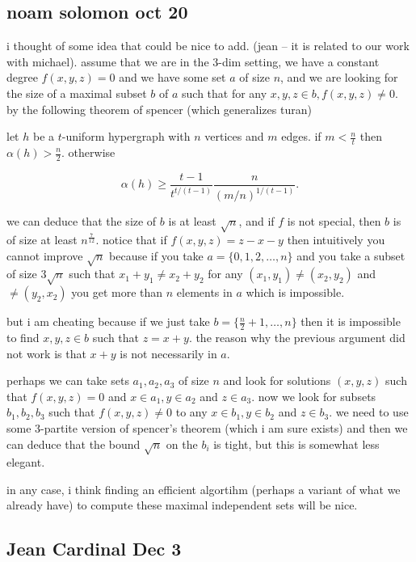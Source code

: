 \subsection{noam solomon oct 20}
i thought of some idea that could be nice to add. (jean -- it is related to
our work with michael).
assume that we are in the 3-dim setting, we have a constant degree
$f(x,y,z)=0$ and we have some set $a$ of size $n$, and we are looking for the
size of a maximal subset $b$ of $a$ such that for any $x,y,z \in b, f(x,y,z) \ne
0$.
by the following theorem of spencer (which generalizes turan)
\begin{theorem}\label{thm:spencer}
let $h$ be a $t$-uniform hypergraph with $n$ vertices and $m$ edges. if
$m<\frac{n}{t}$ then $\alpha(h) > \frac{n}{2}$. otherwise

$$
\alpha (h) \ge \frac{t-1}{t^{t/(t-1)}} \frac n{(m/n)^{1/(t-1)}}.
$$
\end{theorem}
we can deduce that the size of $b$ is at least $\sqrt n$, and if $f$ is not
special, then $b$ is of size at least $n^{\frac{7}{12}}$. notice that if
$f(x,y,z)=z-x-y$ then intuitively you cannot improve $\sqrt n$ because if you
take $a=\{0,1,2,\ldots,n\}$ and you take a subset of size $3\sqrt n$ such that
$x_1+y_1 \ne x_2+y_2$ for any $(x_1,y_1) \ne (x_2,y_2)$ and $\ne (y_2,x_2)$
you get more than $n$ elements in $a$ which is impossible.

but i am cheating because if we just take
$b=\{\frac{n}{2}+1,\ldots,n\}$ then it is
impossible to find $x,y,z \in b$ such that $z=x+y$. the reason why the previous
argument did not work is that $x+y$ is not necessarily in $a$.

perhaps we can take sets $a_1, a_2, a_3$ of size $n$ and look for solutions
$(x,y,z)$ such that $f(x,y,z)=0$ and
$x\in a_1, y\in a_2$ and $z\in a_3$. now we look for subsets $b_1,b_2, b_3$ such
that
$f(x,y,z) \ne 0$ to any $x\in b_1, y\in b_2$ and $z\in b_3$. we need to use some
3-partite version of spencer's theorem (which i am sure exists) and then we
can deduce that the bound $\sqrt n$ on the $b_i$ is tight, but this is somewhat
less elegant.


in any case, i think finding an efficient algortihm (perhaps a variant of
what we already have) to compute these maximal independent sets will be
nice.

\subsection{Jean Cardinal Dec 3}

